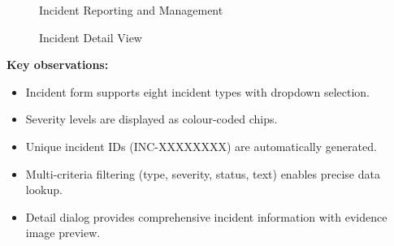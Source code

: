 \begin{figure}[H]
  \centering
  \begin{minipage}{0.45\textwidth}
    \centering
  \end{minipage}
  \hfill
  \begin{minipage}{0.45\textwidth}
    \centering
  \end{minipage}
  \caption{Incident Reporting and Management}
  \label{fig:screenshot-incidents}
\end{figure}

\begin{figure}[H]
  \centering
  \caption{Incident Detail View}
  \label{fig:screenshot-incident-detail}
\end{figure}

\textbf{Key observations:}
\begin{itemize}
  \item Incident form supports eight incident types with dropdown selection.
  \item Severity levels are displayed as colour-coded chips.
  \item Unique incident IDs (INC-XXXXXXXX) are automatically generated.
  \item Multi-criteria filtering (type, severity, status, text) enables precise data lookup.
  \item Detail dialog provides comprehensive incident information with evidence image preview.
\end{itemize}

